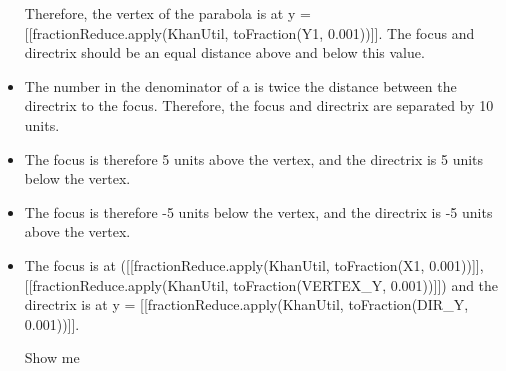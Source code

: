 \documentclass{article}
\begin{document}
\begin{itemize}
                            Therefore, the vertex of the parabola is at y = [[fractionReduce.apply(KhanUtil, toFraction(Y1, 0.001))]].
                            The focus and directrix should be an equal distance above and below this value.
  \item The number in the denominator of a is twice the distance between the directrix to the focus.
                        Therefore, the focus and directrix are separated by 10 units.
  \item The focus is therefore 5 units above the vertex,
                        and the directrix is 5 units below the vertex.
  \item The focus is therefore -5 units below the vertex,
                        and the directrix is -5 units above the vertex.
  \item The focus is at ([[fractionReduce.apply(KhanUtil, toFraction(X1, 0.001))]], [[fractionReduce.apply(KhanUtil, toFraction(VERTEX\_Y, 0.001))]])
                            and the directrix is at y = [[fractionReduce.apply(KhanUtil, toFraction(DIR\_Y, 0.001))]].
                        
                        
                            Show me
\end{itemize}
\end{document}

